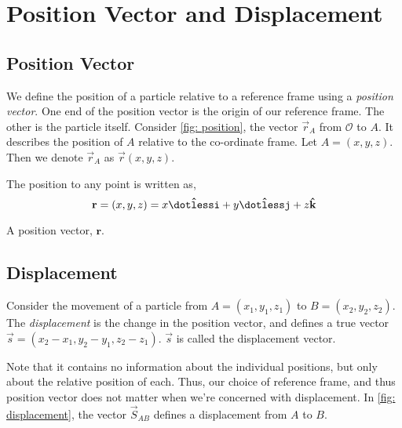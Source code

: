 \section{Position Vector and Displacement}

\subsection{Position Vector}

We define the position of a particle relative to a reference frame using a \emph{position 
vector}. One end of the position vector is the origin of our reference frame. The other is 
the particle itself. Consider \cref{fig: position}, the 
vector \(\vec{r}_A\) from \(\mathcal{O}\) to \(A\). It describes the position of \(A\) relative to the
co-ordinate frame. Let \(A = (x,y,z)\). Then we denote \(\vec{r}_A\) as \(\vec{r}(x,y,z)\).

The position to any point is written as, \[
    \vec{r} = (x,y,z) = x\ihat + y\jhat + z\khat
\]

\begin{marginfigure}
    \centering
    \caption{A position vector, \(\mathbf{r}\).}
    \label{fig: position}
\end{marginfigure}

\subsection{Displacement}


Consider the movement of a particle from \(A = (x_1,y_1,z_1)\) to \(B = (x_2,y_2,z_2)\). 
The \emph{displacement} is the change in the position vector,
and defines a true vector \(\vec{s} = (x_2-x_1,y_2-y_1,z_2-z_1)\).
\(\vec{s}\) is called the displacement vector. 

Note that it contains no information about the
individual positions, but only about the relative position of each. Thus, our choice
of reference frame, and thus position vector does not matter when we're concerned with displacement. 
In \cref{fig: displacement}, the vector
\(\vec{S}_{AB}\) defines a displacement from \(A\) to \(B\).

\begin{marginfigure}
    \centering
    \caption{}
    \label{fig: displacement}
\end{marginfigure}


